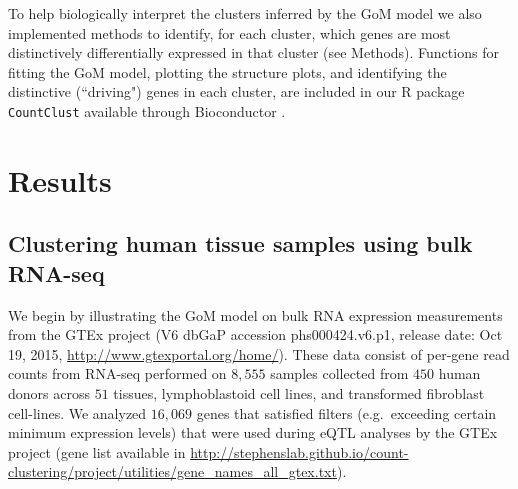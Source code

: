 \documentclass[10pt,letterpaper]{article}
\begin{document}

To help biologically interpret the clusters inferred by the GoM model we also implemented methods to identify, for each cluster, which genes
are most distinctively differentially expressed in that cluster (see Methods). Functions for fitting the GoM model, plotting the
structure plots, and identifying the distinctive (``driving") genes in each cluster, are included in our R package {\tt CountClust} \cite{Dey2016} available through Bioconductor \cite{Gentleman2003}.


\section*{Results}

\subsection*{Clustering human tissue samples using bulk RNA-seq}

We begin by illustrating the GoM model on bulk RNA expression measurements from the GTEx project (V6 dbGaP accession phs000424.v6.p1, release date: Oct 19, 2015, \url{http://www.gtexportal.org/home/}).  These data consist of per-gene read counts from RNA-seq performed on $8,555$ samples collected from $450$ human donors across $51$ tissues, lymphoblastoid cell lines, and transformed fibroblast cell-lines. We analyzed $16,069$ genes that satisfied filters (e.g.~exceeding certain minimum expression levels) that were used during eQTL analyses by the GTEx project (gene list available in \url{http://stephenslab.github.io/count-clustering/project/utilities/gene_names_all_gtex.txt}).
\end{document}
